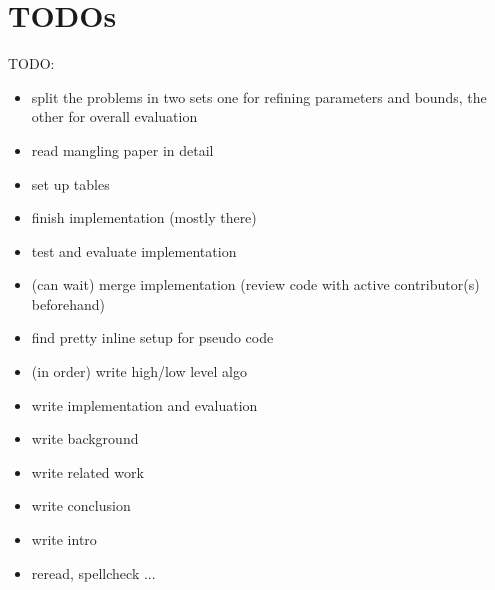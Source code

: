 \documentclass{article}
\begin{document}
\section{TODOs}

TODO:
   \begin{itemize}

      \item split the problems in two sets one for refining parameters and bounds, the other for overall evaluation
      \item read mangling paper in detail
      \item set up tables
      \item finish implementation (mostly there)
      \item test and evaluate implementation 
      \item (can wait) merge implementation (review code with active contributor(s) beforehand)
      \item find pretty inline setup for pseudo code
      \item (in order) write high/low level algo
      \item write implementation and evaluation
      \item write background
      \item write related work
      \item write conclusion
      \item write intro
      \item reread, spellcheck ...
    \end{itemize}
\end{document}
